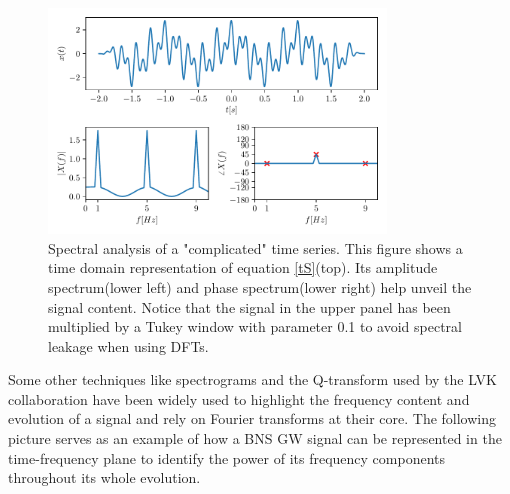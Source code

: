 \begin{figure}[hbt!]
\begin{center}
\includegraphics[width=0.8\textwidth, angle=0]{images/Data_analysis/sig_proc/2_1.pdf}
\captionsetup{width=0.8\textwidth}
\caption[Spectral analysis of a "complicated" time-series]{Spectral analysis of a "complicated" time series. This figure shows a time domain representation of equation \ref{tS}(top). Its amplitude spectrum(lower left) and phase spectrum(lower right) help unveil the signal content. Notice that the signal in the upper panel has been multiplied by a Tukey window with parameter 0.1 to avoid spectral leakage when using DFTs.}
\label{fig:1}
\end{center}
\end{figure}

\FloatBarrier



Some other techniques like spectrograms and the Q-transform used by the LVK collaboration \cite{LIGOScientific:2017vwq} have been widely used to highlight the frequency content and evolution of a signal and rely on Fourier transforms at their core. The following picture serves as an example of how a BNS GW signal can be represented in the time-frequency plane to identify the power of its frequency components throughout its whole evolution.

